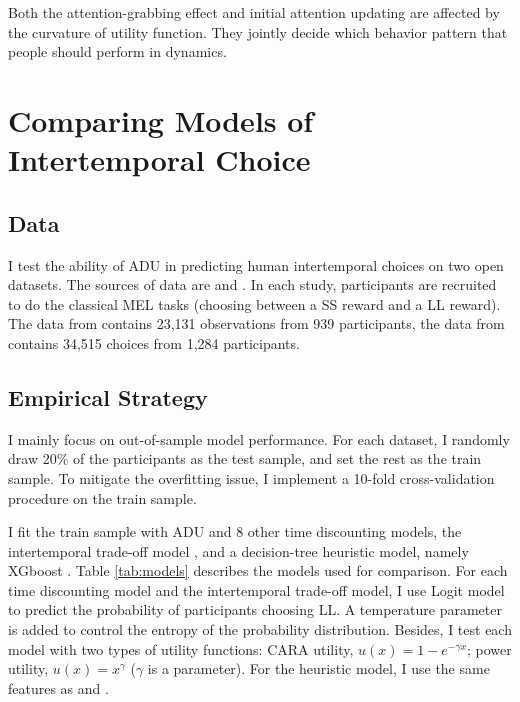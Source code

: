 \documentclass[
  12pt,
]{article}
\begin{document}
Both the attention-grabbing effect and initial attention updating are
affected by the curvature of utility function. They jointly decide which
behavior pattern that people should perform in dynamics.

\hypertarget{comparing-models-of-intertemporal-choice}{%
\section{\texorpdfstring{Comparing Models of Intertemporal Choice
\label{empirical}}{Comparing Models of Intertemporal Choice }}\label{comparing-models-of-intertemporal-choice}}

\hypertarget{data}{%
\subsection{Data}\label{data}}

I test the ability of ADU in predicting human intertemporal choices on
two open datasets. The sources of data are \citet{ericson_money_2015}
and \citet{chavez_hierarchical_2017}. In each study, participants are
recruited to do the classical MEL tasks (choosing between a SS reward
and a LL reward). The data from \citet{ericson_money_2015} contains
23,131 observations from 939 participants, the data from
\citet{chavez_hierarchical_2017} contains 34,515 choices from 1,284
participants.

\hypertarget{empirical-strategy}{%
\subsection{Empirical Strategy}\label{empirical-strategy}}

I mainly focus on out-of-sample model performance. For each dataset, I
randomly draw 20\% of the participants as the test sample, and set the
rest as the train sample. To mitigate the overfitting issue, I implement
a 10-fold cross-validation procedure on the train sample.

I fit the train sample with ADU and 8 other time discounting models, the
intertemporal trade-off model \citep{scholten_weighing_2014}, and a
decision-tree heuristic model, namely XGboost \citep{chen_xgboost_2016}.
Table \ref{tab:models} describes the models used for comparison. For
each time discounting model and the intertemporal trade-off model, I use
Logit model to predict the probability of participants choosing LL. A
temperature parameter is added to control the entropy of the probability
distribution. Besides, I test each model with two types of utility
functions: CARA utility, \(u(x)=1-e^{-\gamma x}\); power utility,
\(u(x) = x^{\gamma}\) (\(\gamma\) is a parameter). For the heuristic
model, I use the same features as \citet{read_drift_2013} and
\citet{ericson_money_2015}.
\end{document}
